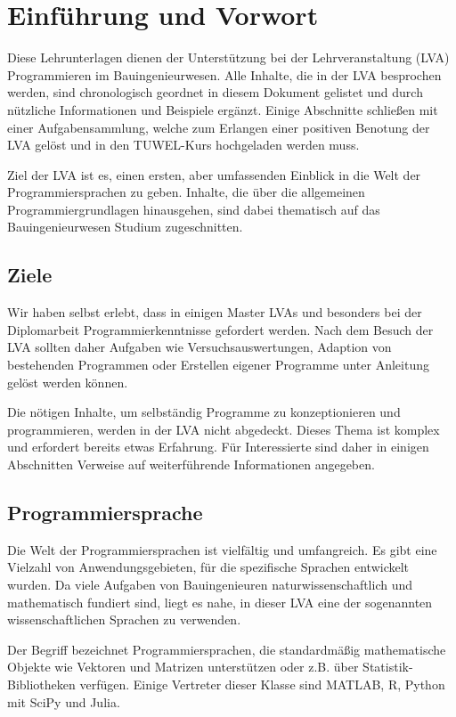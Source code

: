 \section{Einführung und Vorwort}

Diese Lehrunterlagen dienen der Unterstützung bei der Lehrveranstaltung (LVA) Programmieren im Bauingenieurwesen. 
Alle Inhalte, die in der LVA besprochen werden, sind chronologisch geordnet in diesem Dokument gelistet und durch nützliche Informationen und Beispiele ergänzt. 
Einige Abschnitte schließen mit einer Aufgabensammlung, welche zum Erlangen einer positiven Benotung der LVA gelöst und in den TUWEL-Kurs hochgeladen werden muss.

Ziel der LVA ist es, einen ersten, aber umfassenden Einblick in die Welt der Programmiersprachen zu geben.
Inhalte, die über die allgemeinen Programmiergrundlagen hinausgehen, sind dabei thematisch auf das Bauingenieurwesen Studium zugeschnitten.

\subsection{Ziele}

Wir haben selbst erlebt, dass in einigen Master LVAs und besonders bei der Diplomarbeit Programmierkenntnisse gefordert werden.
Nach dem Besuch der LVA sollten daher Aufgaben wie Versuchsauswertungen, Adaption von bestehenden Programmen oder Erstellen eigener Programme unter Anleitung gelöst werden können.

Die nötigen Inhalte, um selbständig Programme zu konzeptionieren und programmieren, werden in der LVA nicht abgedeckt. 
Dieses Thema ist komplex und erfordert bereits etwas Erfahrung. 
Für Interessierte sind daher in einigen Abschnitten Verweise auf weiterführende Informationen angegeben.

\subsection{Programmiersprache}

Die Welt der Programmiersprachen ist vielfältig und umfangreich. 
Es gibt eine Vielzahl von Anwendungsgebieten, für die spezifische Sprachen entwickelt wurden.
Da viele Aufgaben von Bauingenieuren naturwissenschaftlich und mathematisch fundiert sind, liegt es nahe, in dieser LVA eine der sogenannten wissenschaftlichen Sprachen zu verwenden.

Der Begriff bezeichnet Programmiersprachen, die standardmäßig mathematische Objekte wie Vektoren und Matrizen unterstützen oder z.B. über Statistik-Bibliotheken verfügen.
Einige Vertreter dieser Klasse sind MATLAB, R, Python mit SciPy und Julia.

